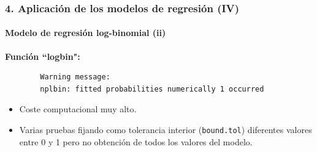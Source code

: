 \documentclass{beamer}
\begin{document}
\begin{frame}[fragile]
\frametitle{4. Aplicación de los modelos de regresión (IV)}
\framesubtitle{Modelo de regresión log-binomial (ii)}
 \textbf{Función ``logbin":}
 \begin{alertblock}{ }
 	\small
 	\begin{verbatim}
		Warning message:
		nplbin: fitted probabilities numerically 1 occurred 
	\end{verbatim}
	\normalsize
\end{alertblock}
 
 \begin{table} [h!]
 	\centering
 \end{table}
	\begin{itemize}
		\item Coste computacional muy alto.
		\item Varias pruebas fijando como tolerancia interior \scriptsize(\texttt{bound.tol}) \normalsize diferentes valores entre 0 y 1 pero no obtención de todos los valores del modelo.
	\end{itemize}
\end{frame}
\end{document}
